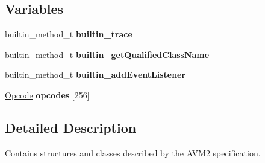 \subsection*{Variables}
\begin{DoxyCompactItemize}
\item 
\hypertarget{namespacejswf_1_1avm2_a2c06af34f064ab97de16756f5991b88d}{builtin\+\_\+method\+\_\+t {\bfseries builtin\+\_\+trace}}\label{namespacejswf_1_1avm2_a2c06af34f064ab97de16756f5991b88d}

\item 
\hypertarget{namespacejswf_1_1avm2_ac830adbfff07d3a2d39adc3e15870969}{builtin\+\_\+method\+\_\+t {\bfseries builtin\+\_\+get\+Qualified\+Class\+Name}}\label{namespacejswf_1_1avm2_ac830adbfff07d3a2d39adc3e15870969}

\item 
\hypertarget{namespacejswf_1_1avm2_ae7436ff576342bfdd4ce3cfc71a6b89f}{builtin\+\_\+method\+\_\+t {\bfseries builtin\+\_\+add\+Event\+Listener}}\label{namespacejswf_1_1avm2_ae7436ff576342bfdd4ce3cfc71a6b89f}

\item 
\hypertarget{namespacejswf_1_1avm2_a47cbfc0a412795b3bf54d89177eefb75}{\hyperlink{structjswf_1_1avm2_1_1_opcode}{Opcode} {\bfseries opcodes} \mbox{[}256\mbox{]}}\label{namespacejswf_1_1avm2_a47cbfc0a412795b3bf54d89177eefb75}

\end{DoxyCompactItemize}


\subsection{Detailed Description}
Contains structures and classes described by the A\+V\+M2 specification. 